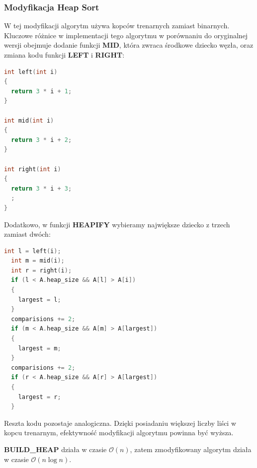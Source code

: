\documentclass{article}
\newcommand{\bigO}{\mathcal{O}}
\begin{document}
\subsubsection{Modyfikacja Heap Sort}
W tej modyfikacji algorytm używa kopców trenarnych zamiast binarnych. Kluczowe różnice w implementacji tego algorytmu w porównaniu do oryginalnej wersji obejmuje dodanie funkcji \textbf{MID}, która zwraca środkowe dziecko węzła, oraz zmiana kodu funkcji \textbf{LEFT} i \textbf{RIGHT}:
\begin{lstlisting}[style=mystyle, language=C++, caption={Implementacja Left, Mid i Right}, label={lst:lmr}]
int left(int i)
{
  return 3 * i + 1;
}

int mid(int i)
{
  return 3 * i + 2;
}

int right(int i)
{
  return 3 * i + 3;
  ;
}
\end{lstlisting}
Dodatkowo, w funkcji \textbf{HEAPIFY} wybieramy największe dziecko z trzech zamiast dwóch:
\begin{lstlisting}[style=mystyle, language=C++, caption={Część implementacji zmodyfikowanego Heapify}, label={lst:buildheap2}]
  int l = left(i);
  int m = mid(i);
  int r = right(i);
  if (l < A.heap_size && A[l] > A[i])
  {
    largest = l;
  }
  comparisions += 2;
  if (m < A.heap_size && A[m] > A[largest])
  {
    largest = m;
  }
  comparisions += 2;
  if (r < A.heap_size && A[r] > A[largest])
  {
    largest = r;
  }
\end{lstlisting}
Reszta kodu pozostaje analogiczna. Dzięki posiadaniu większej liczby liści w kopcu trenarnym, efektywność modyfikacji algorytmu powinna być wyższa.

\textbf{BUILD\_HEAP} działa w czasie \( \bigO(n) \), zatem zmodyfikowany algorytm działa w czasie \( \bigO (n \log n) \).
\end{document}
